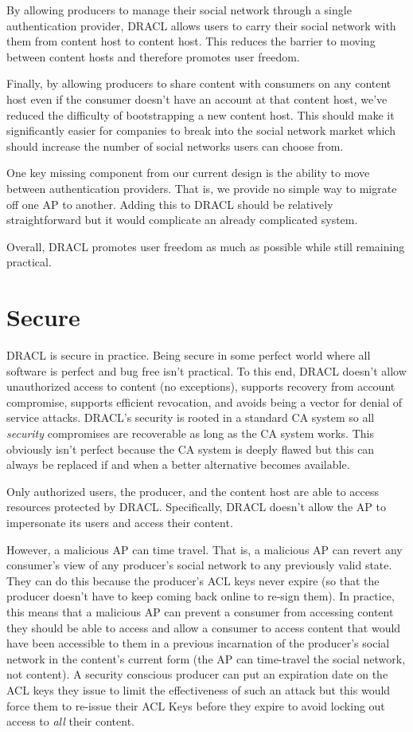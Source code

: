 \documentclass[pdftex,12pt,a4papaer,twoside,notitlepage]{report}
\begin{document}
By allowing producers to manage their social network through a single
authentication provider, DRACL allows users to carry their social network with
them from content host to content host. This reduces the barrier to moving
between content hosts and therefore promotes user freedom.

Finally, by allowing producers to share content with consumers on any content
host even if the consumer doesn't have an account at that content host, we've
reduced the difficulty of bootstrapping a new content host. This should make it
significantly easier for companies to break into the social network market which
should increase the number of social networks users can choose from.

One key missing component from our current design is the ability to move between
authentication providers. That is, we provide no simple way to migrate off one
AP to another. Adding this to DRACL should be relatively straightforward but it
would complicate an already complicated system.

Overall, DRACL promotes user freedom as much as possible while still remaining
practical.

\section{Secure}
\label{sec:secure}

DRACL is secure in practice. Being secure in some perfect world where all
software is perfect and bug free isn't practical. To this end, DRACL doesn't
allow unauthorized access to content (no exceptions), supports recovery from
account compromise, supports efficient revocation, and avoids being a vector for
denial of service attacks. DRACL's security is rooted in a standard CA system so
all \emph{security} compromises are recoverable as long as the CA system works.
This obviously isn't perfect because the CA system is deeply flawed but this can
always be replaced if and when a better alternative becomes available.

Only authorized users, the producer, and the content host are able to access
resources protected by DRACL\@. Specifically, DRACL doesn't allow the AP to
impersonate its users and access their content.

However, a malicious AP can time travel. That is, a malicious AP can revert any
consumer's view of any producer's social network to any previously valid state.
They can do this because the producer's ACL keys never expire (so that the
producer doesn't have to keep coming back online to re-sign them). In practice,
this means that a malicious AP can prevent a consumer from accessing content
they should be able to access and allow a consumer to access content that would
have been accessible to them in a previous incarnation of the producer's social
network in the content's current form (the AP can time-travel the social network,
not content). A security conscious producer can put an expiration date on
the ACL keys they issue to limit the effectiveness of such an attack but this
would force them to re-issue their ACL Keys before they expire to avoid locking
out access to \emph{all} their content.
\end{document}
